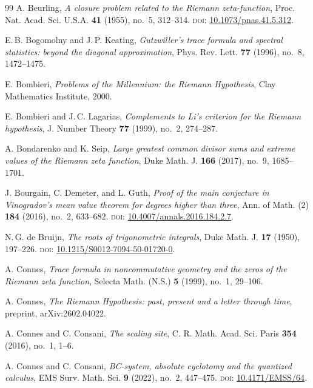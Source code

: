\documentclass[11pt]{amsart}
\theoremstyle{definition}
\theoremstyle{remark}
\begin{document}
\begin{thebibliography}{99}
A. Beurling,
\textit{A closure problem related to the Riemann zeta-function},
Proc. Nat. Acad. Sci. U.S.A. \textbf{41} (1955), no.~5, 312--314.
\textsc{doi:} \href{https://doi.org/10.1073/pnas.41.5.312}{10.1073/pnas.41.5.312}.

E.\,B. Bogomolny and J.\,P. Keating,
\textit{Gutzwiller's trace formula and spectral statistics: beyond the diagonal approximation},
Phys. Rev. Lett. \textbf{77} (1996), no.~8, 1472--1475.

E. Bombieri,
\textit{Problems of the Millennium: the Riemann Hypothesis},
Clay Mathematics Institute, 2000.

E. Bombieri and J.\,C. Lagarias,
\textit{Complements to Li's criterion for the Riemann hypothesis},
J. Number Theory \textbf{77} (1999), no.~2, 274--287.

A. Bondarenko and K. Seip,
\textit{Large greatest common divisor sums and extreme values of the Riemann zeta function},
Duke Math. J. \textbf{166} (2017), no.~9, 1685--1701.

J. Bourgain, C. Demeter, and L. Guth,
\textit{Proof of the main conjecture in Vinogradov's mean value theorem for degrees higher than three},
Ann. of Math. (2) \textbf{184} (2016), no.~2, 633--682.
\textsc{doi:} \href{https://doi.org/10.4007/annals.2016.184.2.7}{10.4007/annals.2016.184.2.7}.

N.\,G. de Bruijn,
\textit{The roots of trigonometric integrals},
Duke Math. J. \textbf{17} (1950), 197--226.
\textsc{doi:} \href{https://doi.org/10.1215/S0012-7094-50-01720-0}{10.1215/S0012-7094-50-01720-0}.

A. Connes,
\textit{Trace formula in noncommutative geometry and the zeros of the Riemann zeta function},
Selecta Math. (N.S.) \textbf{5} (1999), no.~1, 29--106.

A. Connes,
\textit{The Riemann Hypothesis: past, present and a letter through time},
preprint, arXiv:2602.04022.

A. Connes and C. Consani,
\textit{The scaling site},
C. R. Math. Acad. Sci. Paris \textbf{354} (2016), no.~1, 1--6.

A. Connes and C. Consani,
\textit{BC-system, absolute cyclotomy and the quantized calculus},
EMS Surv. Math. Sci. \textbf{9} (2022), no.~2, 447--475.
\textsc{doi:} \href{https://doi.org/10.4171/emss/64}{10.4171/EMSS/64}.


\end{thebibliography}
\end{document}
